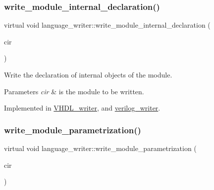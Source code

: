 \mbox{\label{classlanguage__writer_a3971d4b51e6c1762c29f8e0cb0a899f7}} 
\subsubsection{\texorpdfstring{write\+\_\+module\+\_\+internal\+\_\+declaration()}{write\_module\_internal\_declaration()}}
{\footnotesize\ttfamily virtual void language\+\_\+writer\+::write\+\_\+module\+\_\+internal\+\_\+declaration (\begin{DoxyParamCaption}\item[{const \hyperlink{structural__objects_8hpp_a8ea5f8cc50ab8f4c31e2751074ff60b2}{structural\+\_\+object\+Ref} \&}]{cir }\end{DoxyParamCaption})\hspace{0.3cm}{\ttfamily [pure virtual]}}



Write the declaration of internal objects of the module. 


\begin{DoxyParams}{Parameters}
{\em cir} & is the module to be written. \\
\hline
\end{DoxyParams}


Implemented in \hyperlink{structVHDL__writer_a30331328811ba735b896a60304e09074}{V\+H\+D\+L\+\_\+writer}, and \hyperlink{classverilog__writer_a7384e2a4f2485bcadb61747e2371f64e}{verilog\+\_\+writer}.

\mbox{\label{classlanguage__writer_a393febaf037080d4a91588cfa699c8cb}} 
\subsubsection{\texorpdfstring{write\+\_\+module\+\_\+parametrization()}{write\_module\_parametrization()}}
{\footnotesize\ttfamily virtual void language\+\_\+writer\+::write\+\_\+module\+\_\+parametrization (\begin{DoxyParamCaption}\item[{const \hyperlink{structural__objects_8hpp_a8ea5f8cc50ab8f4c31e2751074ff60b2}{structural\+\_\+object\+Ref} \&}]{cir }\end{DoxyParamCaption})\hspace{0.3cm}{\ttfamily [pure virtual]}}



